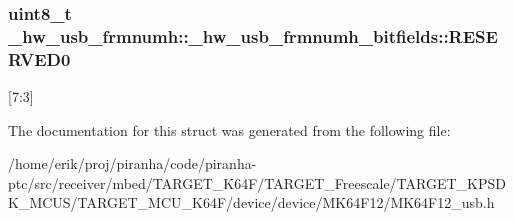 \subsubsection[{\texorpdfstring{R\+E\+S\+E\+R\+V\+E\+D0}{RESERVED0}}]{\setlength{\rightskip}{0pt plus 5cm}uint8\+\_\+t \+\_\+hw\+\_\+usb\+\_\+frmnumh\+::\+\_\+hw\+\_\+usb\+\_\+frmnumh\+\_\+bitfields\+::\+R\+E\+S\+E\+R\+V\+E\+D0}\hypertarget{struct__hw__usb__frmnumh_1_1__hw__usb__frmnumh__bitfields_a5019acf89f437b8a2bd6f5faba1b2a24}{}\label{struct__hw__usb__frmnumh_1_1__hw__usb__frmnumh__bitfields_a5019acf89f437b8a2bd6f5faba1b2a24}
\mbox{[}7\+:3\mbox{]} 

The documentation for this struct was generated from the following file\+:\begin{DoxyCompactItemize}
\item 
/home/erik/proj/piranha/code/piranha-\/ptc/src/receiver/mbed/\+T\+A\+R\+G\+E\+T\+\_\+\+K64\+F/\+T\+A\+R\+G\+E\+T\+\_\+\+Freescale/\+T\+A\+R\+G\+E\+T\+\_\+\+K\+P\+S\+D\+K\+\_\+\+M\+C\+U\+S/\+T\+A\+R\+G\+E\+T\+\_\+\+M\+C\+U\+\_\+\+K64\+F/device/device/\+M\+K64\+F12/M\+K64\+F12\+\_\+usb.\+h\end{DoxyCompactItemize}
